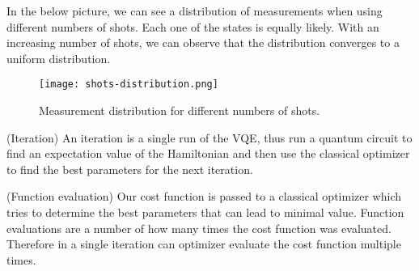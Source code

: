 In the below picture, we can see a distribution of measurements when using different numbers of shots. Each one of the states is equally likely. With an increasing number of shots, we can observe that the distribution converges to a uniform distribution.

\begin{figure}[H]
    \centering
    \texttt{[image: shots-distribution.png]}
    \caption{Measurement distribution for different numbers of shots.}\label{fig:output}
\end{figure}

\begin{definition} (Iteration) 
    An iteration is a single run of the VQE, thus run a quantum circuit to find an expectation value of the Hamiltonian and then use the classical optimizer to find the best parameters for the next iteration.
\end{definition}

\begin{definition}(Function evaluation)
    Our cost function is passed to a classical optimizer which tries to determine the best parameters that can lead to minimal value. Function evaluations are a number of how many times the cost function was evaluated. Therefore in a single iteration can optimizer evaluate the cost function multiple times.
\end{definition}

\\
\\
\\
\\
\\
\\
\\
